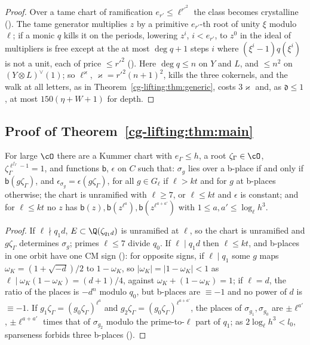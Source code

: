 \begin{proof}
Over a tame chart of ramification $e_{r'}\le\ell^{r'^2}$ the class becomes crystalline
(). The tame generator multiplies $z$ by a
primitive $e_{r'}$-th root of unity $\xi$ modulo $\ell$; if a monic $q$ kills it on the periods,
lowering $z^i$, $i<e_{r'}$, to $z^0$ in the ideal of multipliers is free except at the at most
$\deg q+1$ steps $i$ where $(\xi^i-1)q(\xi^i)$ is not a unit, each of price $\le r'^2$
(). Here $\deg q\le n$ on $Y$ and $L$, and
$\le n^2$ on $(Y\otimes L)^\vee(1)$; so $\ell^\varkappa$, $\varkappa=r'^2(n+1)^2$, kills the three cokernels,
and the walk at all letters, as in Theorem~\ref{cg-lifting:thm:generic}, costs $3\varkappa$ and, as
$\mathfrak d\le1$, at most $150(\eta+W+1)$ for depth.
\end{proof}

\subsection{Proof of Theorem~\ref{cg-lifting:thm:main}}\label{cg-lifting:sec:proof}

\begin{lemma}\label{cg-lifting:lem:letters}
For large $\cO$ there are a Kummer chart with $e_\Gamma\le h$, a root $\zeta_\Gamma\in\cO$, $\zeta_\Gamma^{\ell^{f_\Gamma}-1}=1$,
and functions $\mathsf b$, $\epsilon$ on $C$ such that: $\sigma_g$ lies over a b-place if and only if $\mathsf b(g\zeta_\Gamma)$,
and $\epsilon_{\sigma_g}=\epsilon(g\zeta_\Gamma)$, for all $g\in G_\ell$ if $\ell>kt$ and for $g$ at b-places otherwise;
the chart is unramified with $\ell\ge7$, or $\ell\le kt$ and $\epsilon$ is constant; and for $\ell\le kt$ no
$z$ has $\mathsf b(z),\mathsf b(z^{\ell^a}),\mathsf b(z^{\ell^{a+a'}})$ with $1\le a,a'\le\log_\ell h^3$.
\end{lemma}

\begin{proof}
If $\ell\nmid q_1d$, $E\subset\Q(\zeta_{q_1d})$ is unramified at $\ell$, so the chart is unramified
and $g\zeta_\Gamma$ determines $\sigma_g$; primes $\ell\le7$ divide $q_0$. If $\ell\mid q_1d$ then
$\ell\le kt$, and b-places in one orbit have one CM sign
(): for opposite signs, if $\ell\mid q_1$ some $g$ maps
$\omega_K=(1+\sqrt{-d})/2$ to $1-\omega_K$, so $|\omega_K|=|1-\omega_K|<1$ as $\ell\mid\omega_K(1-\omega_K)=(d+1)/4$, against $\omega_K+(1-\omega_K)=1$; if $\ell=d$, the ratio of the
places is $-d^n$ modulo $q_0$, but b-places are $\equiv-1$ and no power of $d$ is $\equiv-1$. If $g_1\zeta_\Gamma=(g_0\zeta_\Gamma)^{\ell^a}$ and
$g_2\zeta_\Gamma=(g_0\zeta_\Gamma)^{\ell^{a+a'}}$, the places of $\sigma_{g_1},\sigma_{g_0}$ are $\pm\ell^{a'}$,
$\pm\ell^{a+a'}$ times that of $\sigma_{g_2}$ modulo the prime-to-$\ell$ part of $q_1$; as $2\log_\ell h^3<l_0$, sparseness forbids three
b-places ().
\end{proof}

